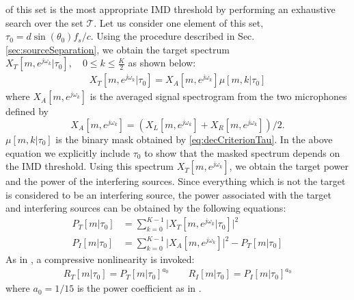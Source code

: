 \documentclass{article}
\begin{document}
of this set is the most appropriate IMD threshold by performing an exhaustive search over the set $\mathcal{T}$. Let us consider one element of this set, $\tau_0 =   d \sin(\theta_{0}) f_s / c$.
Using the procedure described in Sec. \ref{sec:sourceSeparation}, we obtain the target spectrum $X_T[m, e^{j \omega_k} | \tau_0], \quad 0 \le k \le \frac{K}{2}$  as shown below:
\begin{align}
        X_T[m, e^{j \omega_k} | \tau_0] = X_{A}[m, e^{j \omega_k}] \mu[m, k | \tau_0]
\end{align}
where $X_{A}[m, e^{j \omega_k}]$ is the averaged signal spectrogram from the two microphones defined by
\begin{equation}
  X_{A}[m,  e^{j \omega_k}] = (X_L[m, e^{j \omega_k} ]  + X_R[m, e^{j
  \omega_k}])/2.
\end{equation}
$\mu[m, k | \tau_0]$ is the binary mask obtained by \eqref{eq:decCriterionTau}.
In the above equation we explicitly include $\tau_0$ to show that the masked spectrum depends on
the IMD threshold. Using this spectrum $X_T[m, e^{j \omega_k}]$, we obtain the target power
and the power of the interfering sources. Since everything which is not the target is considered to be an interfering source,
the power associated with the target and interfering sources can be obtained by the following equations:
\begin{subequations}
    \begin{align}
    P_T[m|\tau_0] & =  \sum_{k=0}^{K-1} \Big|X_T[m, e^{j \omega_k} | \tau_0]\Big|^2 \\
    P_I[m|\tau_0] & =  \sum_{k=0}^{K-1} \Big|X_{A}[m, e^{j \omega_k}]\Big|^2 - P_T[m|\tau_0]
     \end{align}
     \label{P_TandP_I}
\end{subequations}
 As in \cite{C_Kim_INTERSPEECH_2010_1, C_Kim_IEEETran_2016_1, C_Kim_ICASSP_2012_1}, a compressive nonlinearity is invoked:
 \begin{subequations}
\begin{align}
    R_T[m|\tau_0]  =  P_T[m|\tau_0] ^ {a_0}  \qquad    R_I[m|\tau_0]  =  P_I[m|\tau_0] ^ {a_0}
\end{align}
 \label{NonlinearityOuput}
\end{subequations}
where   $a_0 = 1 / 15$ is the power coefficient as in
\cite{C_Kim_INTERSPEECH_2010_1, C_Kim_IEEETran_2016_1}.
\end{document}
